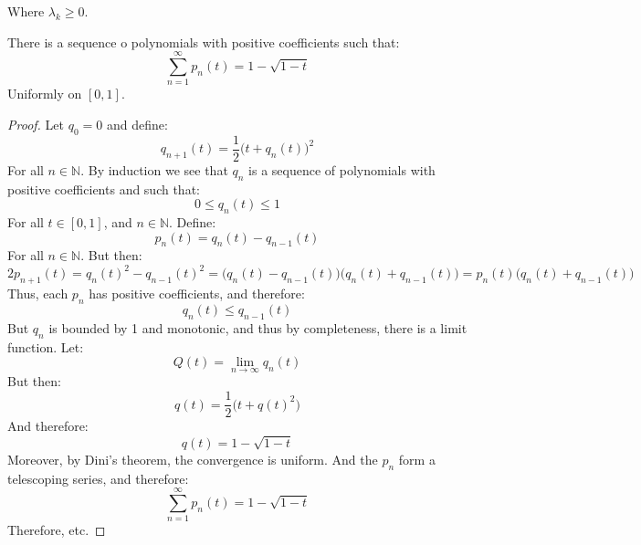     Where $\lambda_{k}\geq{0}$.
    \begin{theorem}
        There is a sequence o polynomials with positive
        coefficients such that:
        \begin{equation}
            \sum_{n=1}^{\infty}p_{n}(t)=1-\sqrt{1-t}
        \end{equation}
        Uniformly on $[0,1]$.
    \end{theorem}
    \begin{proof}
        Let $q_{0}=0$ and define:
        \begin{equation}
            q_{n+1}(t)=\frac{1}{2}\big(t+q_{n}(t)\big)^{2}
        \end{equation}
        For all $n\in\mathbb{N}$. By induction we see that
        $q_{n}$ is a sequence of polynomials with positive
        coefficients and such that:
        \begin{equation}
            0\leq{q}_{n}(t)\leq{1}
        \end{equation}
        For all $t\in[0,1]$, and $n\in\mathbb{N}$. Define:
        \begin{equation}
            p_{n}(t)=q_{n}(t)-q_{n-1}(t)
        \end{equation}
        For all $n\in\mathbb{N}$. But then:
        \begin{equation}
            2p_{n+1}(t)
            =q_{n}(t)^{2}-q_{n-1}(t)^{2}
            =\big(q_{n}(t)-q_{n-1}(t)\big)
                \big(q_{n}(t)+q_{n-1}(t)\big)
            =p_{n}(t)\big(q_{n}(t)+q_{n-1}(t)\big)
        \end{equation}
        Thus, each $p_{n}$ has positive coefficients, and
        therefore:
        \begin{equation}
            q_{n}(t)\leq{q}_{n-1}(t)
        \end{equation}
        But $q_{n}$ is bounded by 1 and monotonic, and thus
        by completeness, there is a limit function. Let:
        \begin{equation}
            Q(t)=\underset{n\rightarrow\infty}{\lim}q_{n}(t)
        \end{equation}
        But then:
        \begin{equation}
            q(t)=\frac{1}{2}\big(t+q(t)^{2}\big)
        \end{equation}
        And therefore:
        \begin{equation}
            q(t)=1-\sqrt{1-t}
        \end{equation}
        Moreover, by Dini's theorem, the convergence is
        uniform. And the $p_{n}$ form a telescoping series,
        and therefore:
        \begin{equation}
            \sum_{n=1}^{\infty}p_{n}(t)=1-\sqrt{1-t}
        \end{equation}
        Therefore, etc.
    \end{proof}

